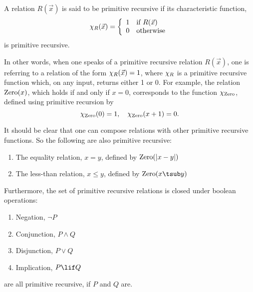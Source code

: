 \documentclass[../../../include/open-logic-section]{subfiles}
\begin{document}


\begin{defn}
A relation $R(\vec x)$ is said to be primitive recursive if its characteristic
function,
\[
\Char{R}(\vec x) = \left\{
  \begin{array}{ll}
  1 & \mbox{if $R(\vec x)$} \\
  0 & \mbox{otherwise}
  \end{array}
\right.
\]
is primitive recursive.
\end{defn}

In other words, when one speaks of a primitive
recursive relation $R(\vec x)$, one is referring to a relation of the
form $\chi_{R}(\vec x) = 1$, where $\chi_{R}$ is a primitive recursive
function which, on any input, returns either 1 or 0. For example, the
relation $\mathrm{Zero}(x)$, which holds if and only if $x = 0$,
corresponds to the function $\chi_{\mathrm{Zero}}$, defined using primitive
recursion by
\[
\chi_{\mathrm{Zero}}(0) = 1, \quad \chi_{\mathrm{Zero}}(x+1) = 0.
\]

It should be clear that one can compose relations with other primitive
recursive functions. So the following are also primitive recursive:
\begin{enumerate}
\item The equality relation, $x = y$, defined by $\mathrm{Zero}(\left|x -
  y\right|)$
\item The less-than relation, $x \leq y$, defined by $\fn{Zero}(x
  \tsub y)$
\end{enumerate}
Furthermore, the set of primitive recursive relations is closed under
boolean operations:
\begin{enumerate}
\item Negation, $\lnot P$
\item Conjunction, $P \land Q$
\item Disjunction, $P \lor Q$
\item Implication, $P \lif Q$
\end{enumerate}
are all primitive recursive, if $P$ and $Q$ are.
\end{document}
